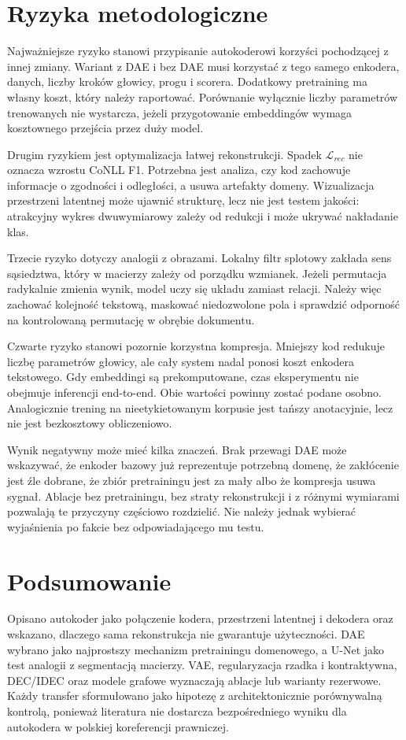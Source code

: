 \section{Ryzyka metodologiczne}
\label{sec:ryzyka-ae}

Najważniejsze ryzyko stanowi przypisanie autokoderowi korzyści pochodzącej z innej zmiany. Wariant z DAE i bez DAE musi korzystać z tego samego enkodera, danych, liczby kroków głowicy, progu i scorera. Dodatkowy pretraining ma własny koszt, który należy raportować. Porównanie wyłącznie liczby parametrów trenowanych nie wystarcza, jeżeli przygotowanie embeddingów wymaga kosztownego przejścia przez duży model.

Drugim ryzykiem jest optymalizacja łatwej rekonstrukcji. Spadek $\mathcal{L}_{rec}$ nie oznacza wzrostu CoNLL F1. Potrzebna jest analiza, czy kod zachowuje informacje o zgodności i odległości, a usuwa artefakty domeny. Wizualizacja przestrzeni latentnej może ujawnić strukturę, lecz nie jest testem jakości: atrakcyjny wykres dwuwymiarowy zależy od redukcji i może ukrywać nakładanie klas.

Trzecie ryzyko dotyczy analogii z obrazami. Lokalny filtr splotowy zakłada sens sąsiedztwa, który w macierzy zależy od porządku wzmianek. Jeżeli permutacja radykalnie zmienia wynik, model uczy się układu zamiast relacji. Należy więc zachować kolejność tekstową, maskować niedozwolone pola i sprawdzić odporność na kontrolowaną permutację w obrębie dokumentu.

Czwarte ryzyko stanowi pozornie korzystna kompresja. Mniejszy kod redukuje liczbę parametrów głowicy, ale cały system nadal ponosi koszt enkodera tekstowego. Gdy embeddingi są prekomputowane, czas eksperymentu nie obejmuje inferencji end-to-end. Obie wartości powinny zostać podane osobno. Analogicznie trening na nieetykietowanym korpusie jest tańszy anotacyjnie, lecz nie jest bezkosztowy obliczeniowo.

Wynik negatywny może mieć kilka znaczeń. Brak przewagi DAE może wskazywać, że enkoder bazowy już reprezentuje potrzebną domenę, że zakłócenie jest źle dobrane, że zbiór pretrainingu jest za mały albo że kompresja usuwa sygnał. Ablacje bez pretrainingu, bez straty rekonstrukcji i z różnymi wymiarami pozwalają te przyczyny częściowo rozdzielić. Nie należy jednak wybierać wyjaśnienia po fakcie bez odpowiadającego mu testu.

\section{Podsumowanie}

Opisano autokoder jako połączenie kodera, przestrzeni latentnej i dekodera oraz wskazano, dlaczego sama rekonstrukcja nie gwarantuje użyteczności. DAE wybrano jako najprostszy mechanizm pretrainingu domenowego, a U-Net jako test analogii z segmentacją macierzy. VAE, regularyzacja rzadka i kontraktywna, DEC/IDEC oraz modele grafowe wyznaczają ablacje lub warianty rezerwowe. Każdy transfer sformułowano jako hipotezę z architektonicznie porównywalną kontrolą, ponieważ literatura nie dostarcza bezpośredniego wyniku dla autokodera w polskiej koreferencji prawniczej.

